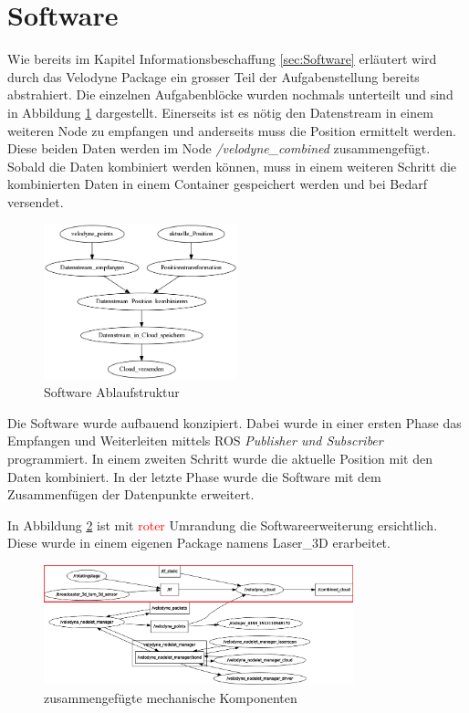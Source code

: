\section{Software}
\label{sec:SoftwareReal}
Wie bereits im Kapitel Informationsbeschaffung \ref{sec:Software} erläutert wird durch das Velodyne Package ein grosser Teil der Aufgabenstellung bereits abstrahiert. Die einzelnen Aufgabenblöcke wurden nochmals unterteilt und sind in Abbildung \ref{fig:software_flow} dargestellt. Einerseits ist es nötig den Datenstream in einem weiteren Node zu empfangen und anderseits muss die Position ermittelt werden. Diese beiden Daten werden im Node \textit{/velodyne\_combined} zusammengefügt. Sobald die Daten kombiniert werden können, muss in einem weiteren Schritt die kombinierten Daten in einem Container gespeichert werden und bei Bedarf versendet.

\begin{figure}[H]
	\centering
	\includegraphics[width=0.5\textwidth]{resources/software_flow.png}
	\caption{Software Ablaufstruktur}
	\label{fig:software_flow}
\end{figure}   

Die Software wurde aufbauend konzipiert. Dabei wurde in einer ersten Phase das Empfangen und Weiterleiten mittels ROS  \textit{Publisher und Subscriber} programmiert. In einem zweiten Schritt wurde die aktuelle Position mit den Daten kombiniert. In der letzte Phase wurde die Software mit dem Zusammenfügen der Datenpunkte erweitert. 

In Abbildung \ref{fig:rqt_graph_erweitert_2} ist mit \textcolor{red}{roter} Umrandung die Softwareerweiterung ersichtlich. Diese wurde in einem eigenen Package namens Laser\_3D erarbeitet. 

\begin{figure}[H]
	\centering
	\includegraphics[width=0.8\textwidth]{resources/rqt_graph_erweitert_2.png}
	\caption{zusammengefügte mechanische Komponenten}
	\label{fig:rqt_graph_erweitert_2}
\end{figure} 


